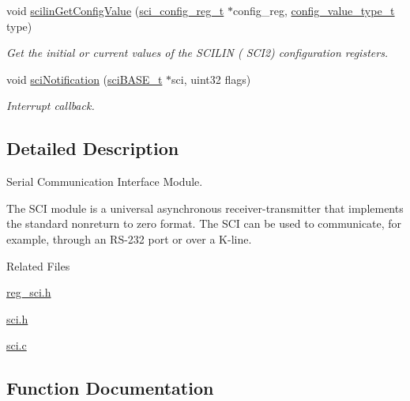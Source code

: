 \begin{DoxyCompactItemize}
\item 
void \mbox{\hyperlink{group__SCI_ga2418574fe9c3d642db1f134926ac6934}{scilin\+Get\+Config\+Value}} (\mbox{\hyperlink{structsci__config__reg}{sci\+\_\+config\+\_\+reg\+\_\+t}} $\ast$config\+\_\+reg, \mbox{\hyperlink{sys__common_8h_a9daf9a5992391b058477d28d107ee5e2}{config\+\_\+value\+\_\+type\+\_\+t}} type)
\begin{DoxyCompactList}\small\item\em Get the initial or current values of the S\+C\+I\+L\+IN ( S\+C\+I2) configuration registers. \end{DoxyCompactList}\item 
void \mbox{\hyperlink{group__SCI_gac25800424a38ab1b3b0960f6b7cc4bc8}{sci\+Notification}} (\mbox{\hyperlink{reg__sci_8h_ad5e2af74efb062728408d4ac1b7735db}{sci\+B\+A\+S\+E\+\_\+t}} $\ast$sci, uint32 flags)
\begin{DoxyCompactList}\small\item\em Interrupt callback. \end{DoxyCompactList}\end{DoxyCompactItemize}


\subsection{Detailed Description}
Serial Communication Interface Module. 

The S\+CI module is a universal asynchronous receiver-\/transmitter that implements the standard nonreturn to zero format. The S\+CI can be used to communicate, for example, through an R\+S-\/232 port or over a K-\/line.

Related Files
\begin{DoxyItemize}
\item \mbox{\hyperlink{reg__sci_8h}{reg\+\_\+sci.\+h}}
\item \mbox{\hyperlink{sci_8h}{sci.\+h}}
\item \mbox{\hyperlink{sci_8c}{sci.\+c}} 
\end{DoxyItemize}

\subsection{Function Documentation}
\mbox{\label{group__SCI_gae6568eda24f29b1b31bd09a5f665b5f8}} 
